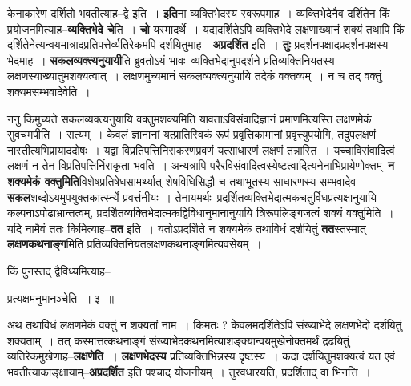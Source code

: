 \documentclass[article,12pt,a4paper]{memoir}
\begin{document}
	  \pstart केनाकारेण दर्शितो भवतीत्याह--द्वे इति । \textbf{इति}ना व्यक्तिभेदस्य स्वरूपमाह । व्यक्तिभेदेनैव दर्शितेन किं प्रयोजनमित्याह--\textbf{व्यक्तिभेदे चे}ति । \textbf{चो} यस्मादर्थे । यद्यदर्शितेऽपि व्यक्तिभेदे लक्षणाख्यानं शक्यं तथापि किं दर्शितेनेत्यन्वयमात्रादप्रतिपत्तेर्व्यतिरेकमपि दर्शयितुमाह—\textbf{अप्रदर्शित} इति । \textbf{तुः} प्रदर्शनपक्षादप्रदर्शनपक्षस्य भेदमाह । \textbf{सकलव्यक्त्यनुयायी}ति ब्रुवतोऽयं भावः--व्यक्तिभेदानुपदर्शने प्रतिव्यक्तिनियतस्य लक्षणस्याख्यातुमशक्यत्वात् । लक्षणमुच्यमानं सकलव्यक्त्यनुयायि तदेकं वक्तव्यम् । न च तद् वक्तुं शक्यमसम्भवादेवेति ।
	\pend
      

	  \pstart ननु किमुच्यते सकलव्यक्त्यनुयायि वक्तुमशक्यमिति यावताऽविसंवादिज्ञानं प्रमाणमित्यस्ति लक्षणमेकं सुवचमपीति । सत्यम् । केवलं ज्ञानानां यत्प्रातिस्विकं रूपं प्रवृत्तिकामानां प्रवृत्त्युपयोगि, तदुपलक्षणं नास्तीत्यभिप्रायाददोषः । यद्वा विप्रतिपत्तिनिराकरणप्रवणं यत्साधारणं लक्षणं तन्नास्ति । यच्चाविसंवादित्वं लक्षणं न तेन विप्रतिपत्तिर्निराकृता भवति । अन्यत्रापि परैरविसंवादित्वस्येष्टत्वादित्यनेनाभिप्रायेणोक्तम्--\textbf{न शक्यमेकं वक्तुमिति}विशेषप्रतिषेधसामर्थ्यात् शेषविधिसिद्धौ च तथाभूतस्य साधारणस्य सम्भवादेव \textbf{सकल}शब्दोऽयमुपयुक्तकार्त्स्न्ये प्रवर्त्त\leavevmode{}नीयः । तेनायमर्थः--प्रदर्शितव्यक्तिभेदात्मकचतुर्विधप्रत्यक्षानुयायि कल्पनाऽपोढाभ्रान्तत्वम्, प्रदर्शितव्यक्तिभेदात्मकद्विविधानुमानानुयायि त्रिरूपलिङ्गजत्वं शक्यं वक्तुमिति । यदि नामैवं ततः किमित्याह--\textbf{तत} इति । यतोऽप्रदर्शिते न शक्यमेकं तथाविधं दर्शयितुं \textbf{तत}स्तस्मात् । \textbf{लक्षणकथनाङ्ग}मिति प्रतिव्यक्तिनियतलक्षणकथनाङ्गमित्यवसेयम् ।
	\pend
	  \bigskip
	  \begingroup
	

	  \pstart किं पुनस्तद् द्वैविध्यमित्याह--
	\pend
        
	  \bigskip
	  \begingroup
	

	  \pstart प्रत्यक्षमनुमानञ्चेति ॥ ३ ॥
	\pend
      
	  \endgroup
	
	  \endgroup
	

	  \pstart अथ तथाविधं लक्षणमेकं वक्तुं न शक्यतां नाम । किमतः ? केवलमदर्शितेऽपि संख्याभेदे लक्षणभेदो दर्शयितुं शक्यताम् । तत् कस्मात्तत्कथनाङ्गं संख्याभेदकथनमित्याशङ्क्यान्वयमुखेनोक्तमर्थं द्रढयितुं व्यतिरेकमुखेणाह--\textbf{लक्षणेति । लक्षणभेदस्य} प्रतिव्यक्तिभिन्नस्य दृष्टस्य । कदा दर्शयितुमशक्यत्वं यत एवं भवतीत्याकाङ्क्षायाम्--\textbf{अप्रदर्शित} इति पश्चाद् योजनीयम् । तुरवधारयति, प्रदर्शिताद् वा भिनत्ति ।
	\pend
      
\end{document}
